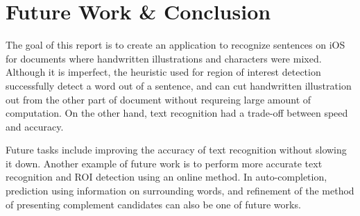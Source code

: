 \section{Future Work \& Conclusion}

The goal of this report is to create an application to recognize sentences
on iOS for documents where handwritten illustrations and characters were mixed.
Although it is imperfect, the heuristic used for region of interest detection successfully
detect a word out of a sentence, and can cut handwritten illustration out from the other
part of document without requreing large amount of computation.
On the other hand, text recognition had a trade-off between speed and accuracy.

Future tasks include improving the accuracy of text recognition without slowing it down.
Another example of future work is to perform more accurate text recognition and ROI detection
using an online method. In auto-completion, prediction using information on surrounding words,
and refinement of the method of presenting complement candidates can also be one of future works.
